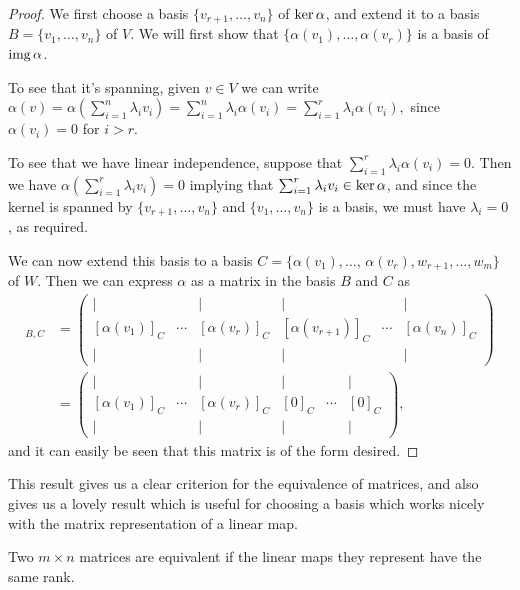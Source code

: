 \documentclass[a4paper]{scrartcl}
\begin{document}
\begin{proof}
    We first choose a basis $\{v_{r + 1}, \dots, v_n\}$ of $\operatorname{ker} \alpha$, and extend it to a basis $B = \{v_1, \dots, v_n\}$ of $V$.
    We will first show that $\{\alpha(v_1), \dots, \alpha(v_r)\}$ is a basis of $\operatorname{img} \alpha$.

    To see that it's spanning, given $v \in V$ we can write
    $\alpha(v) = \alpha\left(\sum_{i = 1}^n \lambda_i v_i\right) = \sum_{i = 1}^n \lambda_i \alpha(v_i) = \sum_{i =1}^r \lambda_i \alpha(v_i),
    $
    since $\alpha(v_i) = 0$ for $i > r$.
    
    To see that we have linear independence, suppose that $\sum_{i = 1}^r \lambda_i \alpha(v_i) = 0$. Then we have
    $
\alpha\left(\sum_{i = 1}^r \lambda_i v_i\right) = 0$ implying that
$\sum_{i = 1}^r \lambda_i v_i \in \operatorname{ker} \alpha$,
    and since the kernel is spanned by $\{v_{r + 1}, \dots, v_n\}$ and $\{v_1, \dots, v_n\}$ is a basis, we must have $\lambda_i = 0$, as required.

    We can now extend this basis to a basis $C = \{\alpha(v_1), \dots$, $\alpha(v_r), w_{r + 1}, \dots, w_m \}$ of $W$. Then we can express $\alpha$ as a matrix in the basis $B$ and $C$ as
    \begin{align*}
        [\alpha]_{B, C} &=
    \begin{pmatrix}
        | &  & | & | &  & |\\
        [\alpha(v_1)]_C & \cdots & [\alpha(v_r)]_C & [\alpha(v_{r + 1})]_C & \cdots & [\alpha(v_n)]_C \\
        | &  & | & | &  & |
    \end{pmatrix} \\
    &= \begin{pmatrix}
        | &  & | & | &  & |\\
        [\alpha(v_1)]_C & \cdots & [\alpha(v_r)]_C & [0]_C & \cdots & [0]_C \\
        | &  & | & | &  & |
    \end{pmatrix},
    \end{align*}
    and it can easily be seen that this matrix is of the form desired.
\end{proof}

This result gives us a clear criterion for the equivalence of matrices, and also gives us a lovely result which is useful for choosing a basis which works nicely with the matrix representation of a linear map.

\begin{corollary}
    Two $m \times n$ matrices are equivalent if the linear maps they represent have the same rank.
\end{corollary}
\end{document}
